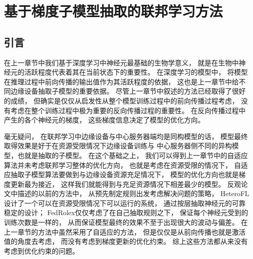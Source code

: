 \chapter{基于梯度子模型抽取的联邦学习方法} 
\section{引言}
在上一章节中我们基于深度学习中神经元最基础的生物学意义，
就是在生物中神经元的活跃程度代表着其在当前状态下的重要性。
在深度学习的模型中，
将模型在推理过程中前向传播的输出值作为其活跃程度的依据，
这也是上一章节中给不同边缘设备抽取子模型的重要依据。
尽管上一章节中叙述的方法已经取得了很好的成绩，
但确实是仅仅从启发性从整个模型训练过程中的前向传播过程考虑，
没有考虑在整个训练过程中极为重要的反向传播过程的重要性。
在反向传播过程中产生的各个神经元的梯度，
这些梯度信息决定了模型的优化方向。

毫无疑问，
在联邦学习中边缘设备与中心服务器端均是同构模型的话，
模型最终取得效果是好于在资源受限情况下边缘设备训练与
中心服务器侧不同的异构模型，也就是抽取的子模型。
在这个基础之上，
我们可以得到上一章节中的自适应算法并未考虑联邦学习整体的优化方向，
也就是考虑在资源受限的情况下，
自适应抽取子模型算法要做到与边缘设备资源充足情况下，
模型的优化方向也就是梯度更新最为接近，
这样我们就能得到与充足资源情况下相差最少的模型。
反观论文中描述的以前的方法中，
从预先制定规则出发考虑解决问题的策略，
HeteroFL设计了一个可以在资源受限情况下可以运行的系统，
通过按层抽取神经元的可靠稳定的设计；
FedRolex仅仅考虑了在自己抽取规则之下，
保证每个神经元受到的训练次数是一样的，
从而保证模型最终的效果不至于出现很大的波动与偏差。
在上一章节的方法中虽然采用了自适应的方法，
但是仅仅是从前向传播也就是激活值的角度去考虑，
而没有考虑到梯度更新的优化约束。
综上这些方法都从来没有考虑到优化约束的问题。

